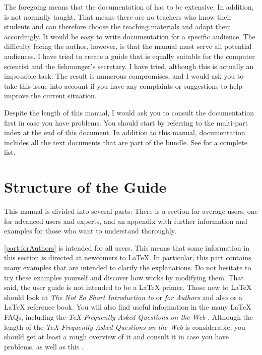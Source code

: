 The foregoing means that the documentation of {\KOMAScript} has to be
extensive. In addition, {\KOMAScript} is not normally taught. That means there
are no teachers who know their students and can therefore choose the teaching
materials and adapt them accordingly. It would be easy to write documentation
for a specific audience. The difficulty facing the author, however, is that
the manual must serve all potential audiences. I have tried to create a guide
that is equally suitable for the computer scientist and the fishmonger's
secretary. I have tried, although this is actually an impossible task. The
result is numerous compromises, and I would ask you to take this issue into
account if you have any complaints or suggestions to help improve the current
situation.

Despite the length of this manual, I would ask you to consult the
documentation first in case you have problems. You should start by referring
to the multi-part index at the end of this document. In addition to this
manual, documentation includes all the text documents that are part of the
bundle. See  for a complete list.

\section{Structure of the Guide}

This manual is divided into several parts: There is a section for average
users, one for advanced users and experts, and an appendix with further
information and examples for those who want to understand {\KOMAScript}
thoroughly.

\autoref{part:forAuthors} is intended for all {\KOMAScript} users. This means
that some information in this section is directed at newcomers to \LaTeX. In
particular, this part contains many examples that are intended to clarify the
explanations. Do not hesitate to try these examples yourself and discover how
{\KOMAScript} works by modifying them. That said, the {\KOMAScript} user guide
is not intended to be a {\LaTeX} primer. Those new to {\LaTeX} should look at
\emph{The Not So Short Introduction to {\LaTeXe}} \cite{lshort} or
\emph{{\LaTeXe} for Authors} \cite{latex:usrguide} and also
\cite{latex:usrguide-historic} or a {\LaTeX} reference book. You will also
find useful information in the many {\LaTeX} FAQs, including the \emph{{\TeX}
  Frequently Asked Questions on the Web} \cite{UK:FAQ}. Although the length of
the \emph{{\TeX} Frequently Asked Questions on the Web} is considerable, you
should get at least a rough overview of it and consult it in case you have
problems, as well as this .

